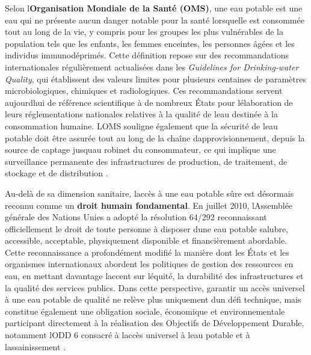 \documentclass[12pt,a4paper,oneside]{report}
\begin{document}
Selon l\textquotesingle{}\textbf{Organisation Mondiale de la Santé
(OMS)}, une eau potable est une eau qui ne présente aucun danger notable
pour la santé lorsqu\textquotesingle elle est consommée tout au long de
la vie, y compris pour les groupes les plus vulnérables de la population
tels que les enfants, les femmes enceintes, les personnes âgées et les
individus immunodéprimés. Cette définition repose sur des
recommandations internationales régulièrement actualisées dans les
\emph{Guidelines for Drinking-water Quality}, qui établissent des
valeurs limites pour plusieurs centaines de paramètres microbiologiques,
chimiques et radiologiques. Ces recommandations servent
aujourd\textquotesingle hui de référence scientifique à de nombreux
États pour l\textquotesingle élaboration de leurs réglementations
nationales relatives à la qualité de l\textquotesingle eau destinée à la
consommation humaine. L\textquotesingle OMS souligne également que la
sécurité de l\textquotesingle eau potable doit être assurée tout au long
de la chaîne d\textquotesingle approvisionnement, depuis la source de
captage jusqu\textquotesingle au robinet du consommateur, ce qui
implique une surveillance permanente des infrastructures de production,
de traitement, de stockage et de distribution \cite{ref23}.

Au-delà de sa dimension sanitaire, l\textquotesingle accès à une eau
potable sûre est désormais reconnu comme un \textbf{droit humain
fondamental}. En juillet 2010, l\textquotesingle Assemblée générale des
Nations Unies a adopté la résolution 64/292 reconnaissant officiellement
le droit de toute personne à disposer d\textquotesingle une eau potable
salubre, accessible, acceptable, physiquement disponible et
financièrement abordable. Cette reconnaissance a profondément modifié la
manière dont les États et les organismes internationaux abordent les
politiques de gestion des ressources en eau, en mettant davantage
l\textquotesingle accent sur l\textquotesingle équité, la durabilité des
infrastructures et la qualité des services publics. Dans cette
perspective, garantir un accès universel à une eau potable de qualité ne
relève plus uniquement d\textquotesingle un défi technique, mais
constitue également une obligation sociale, économique et
environnementale participant directement à la réalisation des Objectifs
de Développement Durable, notamment l\textquotesingle ODD 6 consacré à
l\textquotesingle accès universel à l\textquotesingle eau potable et à
l\textquotesingle assainissement \cite{ref3}.
\end{document}
